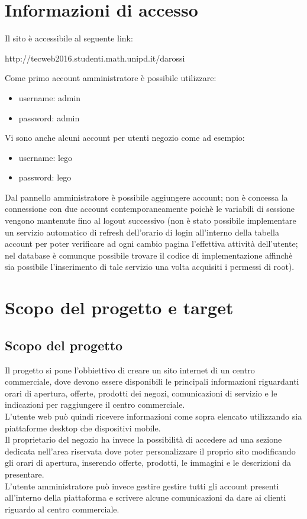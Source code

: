 \documentclass[a4paper,12pt]{article}
\begin{document}
\section{Informazioni di accesso}
Il sito è accessibile al seguente link:
\begin{center}
	http://tecweb2016.studenti.math.unipd.it/darossi
\end{center}
Come primo account amministratore è possibile utilizzare:
\begin{itemize}
	\item username: admin
	\item password: admin
\end{itemize}
Vi sono anche alcuni account per utenti negozio come ad esempio:
\begin{itemize}
	\item username: lego
	\item password: lego
\end{itemize}
Dal pannello amministratore è possibile aggiungere account; non è concessa la connessione con due account contemporaneamente poichè le variabili di sessione vengono mantenute fino al logout successivo (non è stato possibile implementare un servizio automatico di refresh dell'orario di login all'interno della tabella account per poter verificare ad ogni cambio pagina l'effettiva attività dell'utente; nel database è comunque possibile trovare il codice di implementazione affinchè sia possibile l'inserimento di tale servizio una volta acquisiti i permessi di root).
\section{Scopo del progetto e target}
\subsection{Scopo del progetto}
Il progetto si pone l'obbiettivo di creare un sito internet di un centro commerciale, dove devono essere disponibili le principali informazioni riguardanti orari di apertura, offerte, prodotti dei negozi, comunicazioni di servizio e le indicazioni per raggiungere il centro commerciale. \\
L'utente web può quindi ricevere informazioni come sopra elencato utilizzando sia piattaforme desktop che dispositivi mobile.\\
Il proprietario del negozio ha invece la possibilità di accedere ad una sezione dedicata nell'area riservata dove poter personalizzare il proprio sito modificando gli orari di apertura, inserendo offerte, prodotti, le immagini e le descrizioni da presentare.\\
L'utente amministratore può invece gestire gestire tutti gli account presenti all'interno della piattaforma e scrivere alcune comunicazioni da dare ai clienti riguardo al centro commerciale.\\
\end{document}
